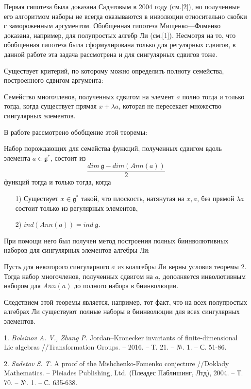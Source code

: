      
     Первая гипотеза была доказана Садэтовым в 2004 году (см.[2]), но полученные его алгоритмом наборы не всегда оказываются в инволюции относительно скобки с замороженным аргументом.
Обобщенная гипотеза Мищенко---Фоменко доказана, например, для полупростых алгебр Ли (см.[1]). Несмотря на то, что обобщенная гипотеза была сформулирована только для регулярных сдвигов, в данной работе эта задача рассмотрена и для сингулярных сдвигов тоже.


Существует критерий, по которому можно определить полноту семейства, построенного сдвигом аргумента:
\begin{theorem}
Семейство многочленов, полученных сдвигом на элемент $a$ полно тогда и только тогда, когда существует прямая $x+\lambda a$, которая не пересекает множество сингулярных элементов.
\end{theorem}
В работе рассмотрено обобщение этой теоремы:
\begin{theorem}
Набор порождающих для семейства функций, полученных сдвигом вдоль элемента $a\in \mathfrak{g}^*$, состоит из 
$$\frac{dim \  \mathfrak{g}- dim (Ann(a))} 2$$
функций тогда и только тогда, когда
\begin{itemize}
    \item [1)] Существует $x\in \mathfrak{g}^*$ такой, что плоскость, натянутая на $x,a$, без прямой $\lambda a$ состоит только из регулярных элементов,
    \item[2)] $ind(Ann(a))=ind \  \mathfrak{g}$.
\end{itemize}
\end{theorem}
При помощи него был получен метод построения полных биинволютивных наборов для сингулярных элементов алгебры Ли:
\begin{theorem}
Пусть для некоторого сингулярного $a$ из коалгебры Ли верны условия теоремы 2.
Тогда набор многочленов, полученных сдвигом на $a$,  дополняется инволютивным набором для $Ann(a)$ до полного набора в биинволюции.
\end{theorem}
Следствием этой теоремы является, например, тот факт, что на всех полупростых алгебрах Ли существуют полные наборы в биинволюции для всех сингулярных элементов.
\litlist

1. {\it Bolsinov A. V., Zhang P.} Jordan–Kronecker invariants of finite-dimensional Lie algebras //Transformation Groups. – 2016. – Т. 21. – №. 1. – С. 51-86.

2. {\it Sadetov S. T.} A proof of the Mishchenko-Fomenko conjecture //Doklady Mathematics. – Pleiades Publishing, Ltd. (Плеадес Паблишинг, Лтд), 2004. – Т. 70. – №. 1. – С. 635-638.
